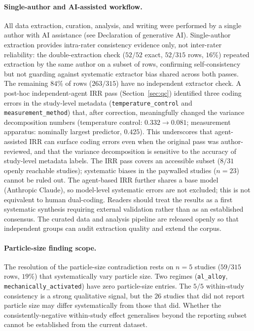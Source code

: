 \paragraph{Single-author and AI-assisted workflow.}
All data extraction, curation, analysis, and writing were performed by a single author
with AI assistance (see Declaration of generative AI). Single-author extraction provides
intra-rater consistency evidence only, not inter-rater reliability: the double-extraction
check ($52/52$ exact, $52/315$ rows, $16\%$) repeated extraction by the same author on a
subset of rows, confirming self-consistency but not guarding against systematic extractor
bias shared across both passes. The remaining $84\%$ of rows ($263/315$) have no
independent extractor check. A post-hoc independent-agent IRR pass (Section~\ref{sec:qc})
identified three coding errors in the study-level metadata
(\texttt{temperature\_control} and \texttt{measurement\_method})
that, after correction, meaningfully changed the variance decomposition numbers
(temperature control: $0.332\to0.081$; measurement apparatus: nominally largest predictor,
$0.425$). This underscores that agent-assisted IRR can surface coding errors even when
the original pass was author-reviewed, and that the variance decomposition is sensitive
to the accuracy of study-level metadata labels. The IRR pass covers an accessible
subset ($8/31$ openly reachable studies); systematic biases in the paywalled studies
($n\!=\!23$) cannot be ruled out. The agent-based IRR further shares a base model
(Anthropic Claude), so model-level systematic errors are not excluded; this is not
equivalent to human dual-coding. Readers should treat the results as a first
systematic synthesis requiring external validation rather than as an established consensus.
The curated data and analysis pipeline are released openly so that independent groups can
audit extraction quality and extend the corpus.

\paragraph{Particle-size finding scope.}
The resolution of the particle-size contradiction rests on $n\!=\!5$ studies
($59/315$ rows, $19\%$) that systematically vary particle size. Two regimes
(\texttt{al\_alloy}, \texttt{mechanically\_activated}) have zero particle-size entries.
The $5/5$ within-study consistency is a strong qualitative signal, but the $26$ studies
that did not report particle size may differ systematically from those that did.
Whether the consistently-negative within-study effect generalises beyond the reporting
subset cannot be established from the current dataset.

